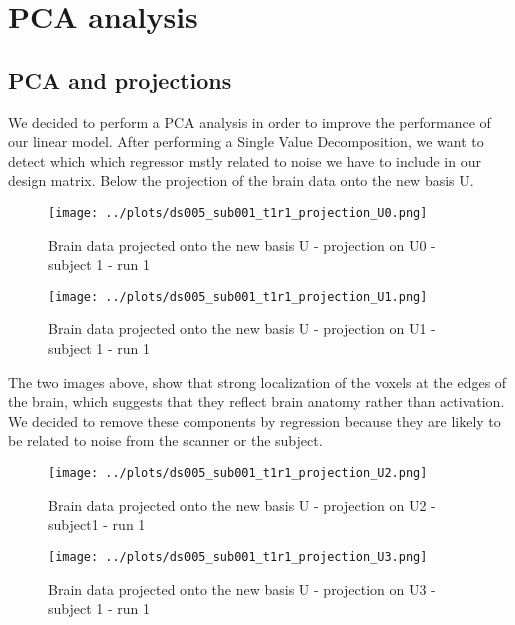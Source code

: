 \section{PCA analysis}
\subsection{PCA and projections}
\noindent
We decided to perform a PCA analysis in order to improve the performance of our
linear model. After performing a Single Value Decomposition, we want to detect which
which regressor mstly related to noise we have to include in our design matrix. Below
the projection of the brain data onto the new basis U.

\begin{figure}[H]
    \centering
        \texttt{[image: ../plots/ds005\_sub001\_t1r1\_projection\_U0.png]}
     \caption{Brain data projected onto the new basis U - projection on U0 - subject 1 - run 1}
\end{figure}

\begin{figure}[H]
    \centering
        \texttt{[image: ../plots/ds005\_sub001\_t1r1\_projection\_U1.png]}
     \caption{Brain data projected onto the new basis U - projection on U1 - subject 1 - run 1}
\end{figure}

\noindent
The two images above, show that strong localization of the voxels at the edges of the
brain, which suggests that they reflect brain anatomy rather than activation. 
We decided to remove these components by regression because they are likely to be 
related to noise from the scanner or the subject. 

\begin{figure}[H]
    \centering
        \texttt{[image: ../plots/ds005\_sub001\_t1r1\_projection\_U2.png]}
     \caption{Brain data projected onto the new basis U - projection on U2 - subject1 - run 1}
\end{figure}

\begin{figure}[H]
    \centering
        \texttt{[image: ../plots/ds005\_sub001\_t1r1\_projection\_U3.png]}
     \caption{Brain data projected onto the new basis U - projection on U3 - subject 1 - run 1}
\end{figure}

